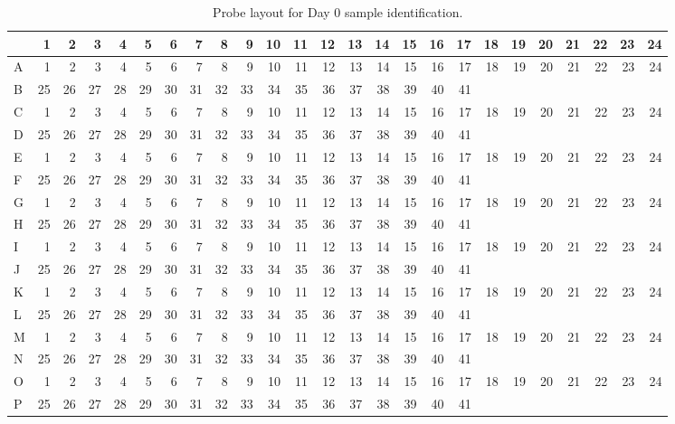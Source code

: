 \documentclass{article}
\begin{document}
\begin{table}
  \centering
{\tiny
\begin{tabular}{lrrrrrrrrrrrrrrrrrrrrrrrr}
 & 1 & 2 & 3 & 4 & 5 & 6 & 7 & 8 & 9 & 10 & 11 & 12 & 13 & 14 & 15 & 16 & 17 & 18 & 19 & 20 & 21 & 22 & 23 & 24\\
\hline
A & 1 & 2 & 3 & 4 & 5 & 6 & 7 & 8 & 9 & 10 & 11 & 12 & 13 & 14 & 15 & 16 & 17 & 18 & 19 & 20 & 21 & 22 & 23 & 24\\
B & 25 & 26 & 27 & 28 & 29 & 30 & 31 & 32 & 33 & 34 & 35 & 36 & 37 & 38 & 39 & 40 & 41 &  &  &  &  &  &  & \\
C & 1 & 2 & 3 & 4 & 5 & 6 & 7 & 8 & 9 & 10 & 11 & 12 & 13 & 14 & 15 & 16 & 17 & 18 & 19 & 20 & 21 & 22 & 23 & 24\\
D & 25 & 26 & 27 & 28 & 29 & 30 & 31 & 32 & 33 & 34 & 35 & 36 & 37 & 38 & 39 & 40 & 41 &  &  &  &  &  &  & \\
E & 1 & 2 & 3 & 4 & 5 & 6 & 7 & 8 & 9 & 10 & 11 & 12 & 13 & 14 & 15 & 16 & 17 & 18 & 19 & 20 & 21 & 22 & 23 & 24\\
F & 25 & 26 & 27 & 28 & 29 & 30 & 31 & 32 & 33 & 34 & 35 & 36 & 37 & 38 & 39 & 40 & 41 &  &  &  &  &  &  & \\
G & 1 & 2 & 3 & 4 & 5 & 6 & 7 & 8 & 9 & 10 & 11 & 12 & 13 & 14 & 15 & 16 & 17 & 18 & 19 & 20 & 21 & 22 & 23 & 24\\
H & 25 & 26 & 27 & 28 & 29 & 30 & 31 & 32 & 33 & 34 & 35 & 36 & 37 & 38 & 39 & 40 & 41 &  &  &  &  &  &  & \\
I & 1 & 2 & 3 & 4 & 5 & 6 & 7 & 8 & 9 & 10 & 11 & 12 & 13 & 14 & 15 & 16 & 17 & 18 & 19 & 20 & 21 & 22 & 23 & 24\\
J & 25 & 26 & 27 & 28 & 29 & 30 & 31 & 32 & 33 & 34 & 35 & 36 & 37 & 38 & 39 & 40 & 41 &  &  &  &  &  &  & \\
K & 1 & 2 & 3 & 4 & 5 & 6 & 7 & 8 & 9 & 10 & 11 & 12 & 13 & 14 & 15 & 16 & 17 & 18 & 19 & 20 & 21 & 22 & 23 & 24\\
L & 25 & 26 & 27 & 28 & 29 & 30 & 31 & 32 & 33 & 34 & 35 & 36 & 37 & 38 & 39 & 40 & 41 &  &  &  &  &  &  & \\
M & 1 & 2 & 3 & 4 & 5 & 6 & 7 & 8 & 9 & 10 & 11 & 12 & 13 & 14 & 15 & 16 & 17 & 18 & 19 & 20 & 21 & 22 & 23 & 24\\
N & 25 & 26 & 27 & 28 & 29 & 30 & 31 & 32 & 33 & 34 & 35 & 36 & 37 & 38 & 39 & 40 & 41 &  &  &  &  &  &  & \\
O & 1 & 2 & 3 & 4 & 5 & 6 & 7 & 8 & 9 & 10 & 11 & 12 & 13 & 14 & 15 & 16 & 17 & 18 & 19 & 20 & 21 & 22 & 23 & 24\\
P & 25 & 26 & 27 & 28 & 29 & 30 & 31 & 32 & 33 & 34 & 35 & 36 & 37 & 38 & 39 & 40 & 41 &  &  &  &  &  &  & \\
\end{tabular}
}
  \caption{Probe layout for Day 0 sample identification.}
  \label{tab:probe-layout}
\end{table}
\end{document}
